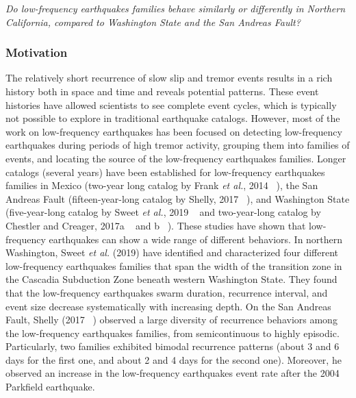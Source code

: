 \documentclass[letterpaper, 12pt]{article}
\begin{document}
\textit{Do low-frequency earthquakes families behave similarly or differently in Northern California, compared to Washington State and the San Andreas Fault?}

\subsubsection*{Motivation}

The relatively short recurrence of slow slip and tremor events results in a rich history both in space and time and reveals potential patterns.  These event histories have allowed scientists to see complete event cycles, which is typically not possible to explore in traditional earthquake catalogs. However, most of the work on low-frequency earthquakes has been focused on detecting low-frequency earthquakes during periods of high tremor activity, grouping them into families of events, and locating the source of the low-frequency earthquakes families. Longer catalogs (several years) have been established for low-frequency earthquakes families in Mexico (two-year long catalog by Frank \textit{et al.}, 2014 ~\cite{FRA_2014}), the San Andreas Fault (fifteen-year-long catalog by Shelly, 2017 ~\cite{SHE_2017}), and Washington State (five-year-long catalog by Sweet \textit{et al.}, 2019 ~\cite{SWE_2019} and two-year-long catalog by Chestler and Creager, 2017a ~\cite{CHE_2017_JGR} and b ~\cite{CHE_2017_G3}). These studies have shown that low-frequency earthquakes can show a wide range of different behaviors. In northern Washington, Sweet \textit{et al.} (2019) have identified and characterized four different low-frequency earthquakes families that span the width of the transition zone in the Cascadia Subduction Zone beneath western Washington State. They found that the low-frequency earthquakes swarm duration, recurrence interval, and event size decrease systematically with increasing depth. On the San Andreas Fault, Shelly (2017 ~\cite{SHE_2017}) observed a large diversity of recurrence behaviors among the low-frequency earthquakes families, from semicontinuous to highly episodic. Particularly, two families exhibited bimodal recurrence patterns (about 3 and 6 days for the first one, and about 2 and 4 days for the second one). Moreover, he observed an increase in the low-frequency earthquakes event rate after the 2004 Parkfield earthquake. \\
\end{document}
